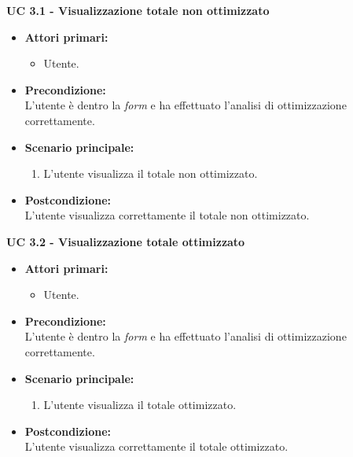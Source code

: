 \noindent \textbf{\large UC 3.1 - Visualizzazione totale non ottimizzato}
\label{uc:visualizzazione-totale-non-ottimizzato}
\begin{itemize}

	\item \textbf{Attori primari: }
		\begin{itemize}
			\item Utente.
		\end{itemize}

	\item \textbf{Precondizione: }\\[0.3cm]
		L'utente è dentro la \textit{form} e ha effettuato l'analisi di ottimizzazione correttamente.

	\item \textbf{Scenario principale: }
		\begin{enumerate}
			\item L'utente visualizza il totale non ottimizzato.
		\end{enumerate}
		

	\item \textbf{Postcondizione: }\\[0.3cm]
		L'utente visualizza correttamente il totale non ottimizzato.

\end{itemize}

\vspace{0.4cm}

\noindent \textbf{\large UC 3.2 - Visualizzazione totale ottimizzato}
\label{uc:visualizzazione-totale-ottimizzato}
\begin{itemize}

	\item \textbf{Attori primari: }
		\begin{itemize}
			\item Utente.
		\end{itemize}

	\item \textbf{Precondizione: }\\[0.3cm]
		L'utente è dentro la \textit{form} e ha effettuato l'analisi di ottimizzazione correttamente.

	\item \textbf{Scenario principale: }
		\begin{enumerate}
			\item L'utente visualizza il totale ottimizzato.
		\end{enumerate}
		

	\item \textbf{Postcondizione: }\\[0.3cm]
		L'utente visualizza correttamente il totale ottimizzato.

\end{itemize}


